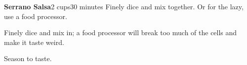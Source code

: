 \documentclass[../Cookbook.tex]{subfiles}
\begin{document}
\begin{recipe}{\textbf{Serrano Salsa}}{2 cups}{30 minutes}
	Finely dice and mix together. Or for the lazy, use a food processor.

	Finely dice and mix in; a food processor will break too much of the cells and make it taste weird.

	Season to taste.

\end{recipe}
\end{document}
